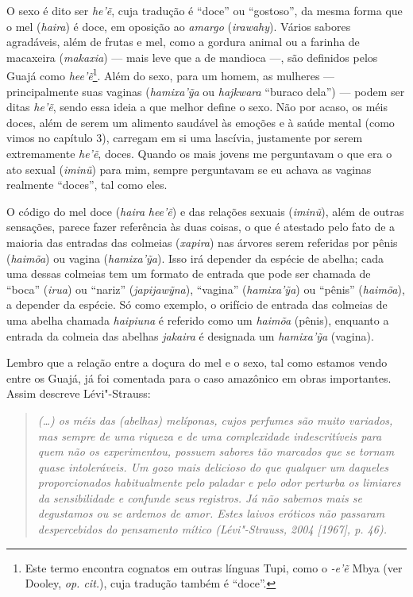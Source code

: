 O sexo é dito ser \emph{he'ẽ}, cuja tradução é ``doce'' ou ``gostoso'', da
mesma forma que o mel (\emph{haira}) é doce, em oposição ao
\emph{amargo} (\emph{irawahy}). Vários sabores agradáveis, além de
frutas e mel, como a gordura animal ou a farinha de macaxeira
(\emph{makaxia}) --- mais leve que a de mandioca ---, são definidos pelos
Guajá como \emph{hee'ẽ}\footnote{Este termo encontra cognatos em outras
  línguas Tupi, como o \emph{-e'ẽ} Mbya (ver Dooley, \emph{op. cit.}), cuja
  tradução também é ``doce''.}. Além do sexo, para um homem, as mulheres ---
principalmente suas vaginas (\emph{hamixa'ỹa} ou \emph{hajkwara}
``buraco dela'') --- podem ser ditas \emph{he'ẽ}, sendo essa ideia a que
melhor define o sexo. Não por acaso, os méis doces, além de serem um
alimento saudável às emoções e à saúde mental (como vimos no capítulo
3), carregam em si uma lascívia, justamente por serem extremamente
\emph{he'ẽ}, doces. Quando os mais jovens me perguntavam o que era o ato
sexual (\emph{iminũ}) para mim, sempre perguntavam se eu achava as
vaginas realmente ``doces'', tal como eles.

O código do mel doce (\emph{haira} \emph{hee'ẽ}) e das relações sexuais
(\emph{iminũ}), além de outras sensações, parece fazer referência às
duas coisas, o que é atestado pelo fato de a maioria das entradas das
colmeias (\emph{xapira}) nas árvores serem referidas por pênis
(\emph{haimõa}) ou vagina (\emph{hamixa'ỹa}). Isso irá depender da
espécie de abelha; cada uma dessas colmeias tem um formato de entrada
que pode ser chamada de ``boca'' (\emph{irua}) ou ``nariz''
(\emph{japijawỹna}), ``vagina'' (\emph{hamixa'ỹa}) ou ``pênis''
(\emph{haimõa}), a depender da espécie. Só como exemplo, o orifício de
entrada das colmeias de uma abelha chamada \emph{haipiuna} é referido
como um \emph{haimõa} (pênis), enquanto a entrada da colmeia das abelhas
\emph{jakaira} é designada um \emph{hamixa'ỹa} (vagina).

Lembro que a relação entre a doçura do mel e o sexo, tal como estamos
vendo entre os Guajá, já foi comentada para o caso amazônico em obras
importantes. Assim descreve Lévi"-Strauss:

\begin{quote}
\emph{(\ldots{}) os méis das (abelhas) melíponas, cujos perfumes são muito
variados, mas sempre de uma riqueza e de uma complexidade indescritíveis
para quem não os experimentou, possuem sabores tão marcados que se
tornam quase intoleráveis. Um gozo mais delicioso do que qualquer um
daqueles proporcionados habitualmente pelo paladar e pelo odor perturba
os limiares da sensibilidade e confunde seus registros. Já não sabemos
mais se degustamos ou se ardemos de amor. Estes laivos eróticos não
passaram despercebidos do pensamento mítico (Lévi"-Strauss, 2004 [1967],
p. 46).}
\end{quote}

